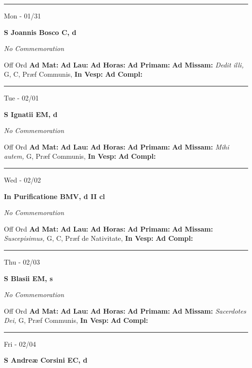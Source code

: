 \documentclass[letterpaper, 10pt]{article}
\begin{document}
\hrule
\begin{center}
Mon - 01/31
\end{center}\textbf{ \large S Joannis Bosco C, \textnormal{\normalsize d}}

\textit{No Commemoration}\begin{justify}
Off Ord
\textbf{Ad Mat: }
\textbf{Ad Lau: }
\textbf{Ad Horas: }
\textbf{Ad Primam: }
\textbf{Ad Missam:} \textit{Dedit illi, } G, C, Præf Communis, 
\textbf{In Vesp: }
\textbf{Ad Compl: }\end{justify}



\hrule
\begin{center}
Tue - 02/01
\end{center}\textbf{ \large S Ignatii EM, \textnormal{\normalsize d}}

\textit{No Commemoration}\begin{justify}
Off Ord
\textbf{Ad Mat: }
\textbf{Ad Lau: }
\textbf{Ad Horas: }
\textbf{Ad Primam: }
\textbf{Ad Missam:} \textit{Mihi autem, } G, Præf Communis, 
\textbf{In Vesp: }
\textbf{Ad Compl: }\end{justify}



\hrule
\begin{center}
Wed - 02/02
\end{center}\textbf{ \large In Purificatione BMV, \textnormal{\normalsize d II cl}}

\textit{No Commemoration}\begin{justify}
Off Ord
\textbf{Ad Mat: }
\textbf{Ad Lau: }
\textbf{Ad Horas: }
\textbf{Ad Primam: }
\textbf{Ad Missam:} \textit{Suscepisimus, } G, C, Præf de Nativitate, 
\textbf{In Vesp: }
\textbf{Ad Compl: }\end{justify}



\hrule
\begin{center}
Thu - 02/03
\end{center}\textbf{ \large S Blasii EM, \textnormal{\normalsize s}}

\textit{No Commemoration}\begin{justify}
Off Ord
\textbf{Ad Mat: }
\textbf{Ad Lau: }
\textbf{Ad Horas: }
\textbf{Ad Primam: }
\textbf{Ad Missam:} \textit{Sacerdotes Dei, } G, Præf Communis, 
\textbf{In Vesp: }
\textbf{Ad Compl: }\end{justify}



\hrule
\begin{center}
Fri - 02/04
\end{center}\textbf{ \large S Andreæ Corsini EC, \textnormal{\normalsize d}}
\end{document}
